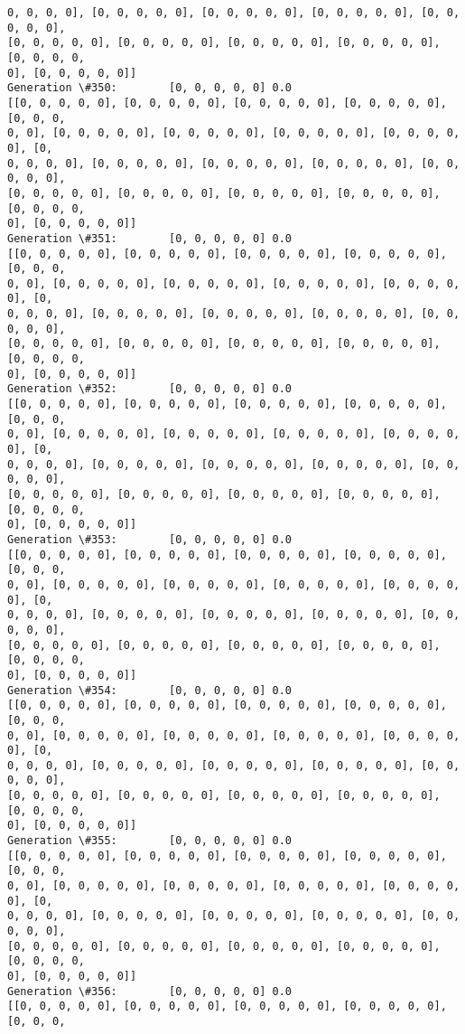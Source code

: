 \documentclass[11pt]{article}
\begin{document}
\begin{Verbatim}[commandchars=\\\{\}]
0, 0, 0, 0], [0, 0, 0, 0, 0], [0, 0, 0, 0, 0], [0, 0, 0, 0, 0], [0, 0, 0, 0, 0],
[0, 0, 0, 0, 0], [0, 0, 0, 0, 0], [0, 0, 0, 0, 0], [0, 0, 0, 0, 0], [0, 0, 0, 0,
0], [0, 0, 0, 0, 0]]
Generation \#350:        [0, 0, 0, 0, 0] 0.0
[[0, 0, 0, 0, 0], [0, 0, 0, 0, 0], [0, 0, 0, 0, 0], [0, 0, 0, 0, 0], [0, 0, 0,
0, 0], [0, 0, 0, 0, 0], [0, 0, 0, 0, 0], [0, 0, 0, 0, 0], [0, 0, 0, 0, 0], [0,
0, 0, 0, 0], [0, 0, 0, 0, 0], [0, 0, 0, 0, 0], [0, 0, 0, 0, 0], [0, 0, 0, 0, 0],
[0, 0, 0, 0, 0], [0, 0, 0, 0, 0], [0, 0, 0, 0, 0], [0, 0, 0, 0, 0], [0, 0, 0, 0,
0], [0, 0, 0, 0, 0]]
Generation \#351:        [0, 0, 0, 0, 0] 0.0
[[0, 0, 0, 0, 0], [0, 0, 0, 0, 0], [0, 0, 0, 0, 0], [0, 0, 0, 0, 0], [0, 0, 0,
0, 0], [0, 0, 0, 0, 0], [0, 0, 0, 0, 0], [0, 0, 0, 0, 0], [0, 0, 0, 0, 0], [0,
0, 0, 0, 0], [0, 0, 0, 0, 0], [0, 0, 0, 0, 0], [0, 0, 0, 0, 0], [0, 0, 0, 0, 0],
[0, 0, 0, 0, 0], [0, 0, 0, 0, 0], [0, 0, 0, 0, 0], [0, 0, 0, 0, 0], [0, 0, 0, 0,
0], [0, 0, 0, 0, 0]]
Generation \#352:        [0, 0, 0, 0, 0] 0.0
[[0, 0, 0, 0, 0], [0, 0, 0, 0, 0], [0, 0, 0, 0, 0], [0, 0, 0, 0, 0], [0, 0, 0,
0, 0], [0, 0, 0, 0, 0], [0, 0, 0, 0, 0], [0, 0, 0, 0, 0], [0, 0, 0, 0, 0], [0,
0, 0, 0, 0], [0, 0, 0, 0, 0], [0, 0, 0, 0, 0], [0, 0, 0, 0, 0], [0, 0, 0, 0, 0],
[0, 0, 0, 0, 0], [0, 0, 0, 0, 0], [0, 0, 0, 0, 0], [0, 0, 0, 0, 0], [0, 0, 0, 0,
0], [0, 0, 0, 0, 0]]
Generation \#353:        [0, 0, 0, 0, 0] 0.0
[[0, 0, 0, 0, 0], [0, 0, 0, 0, 0], [0, 0, 0, 0, 0], [0, 0, 0, 0, 0], [0, 0, 0,
0, 0], [0, 0, 0, 0, 0], [0, 0, 0, 0, 0], [0, 0, 0, 0, 0], [0, 0, 0, 0, 0], [0,
0, 0, 0, 0], [0, 0, 0, 0, 0], [0, 0, 0, 0, 0], [0, 0, 0, 0, 0], [0, 0, 0, 0, 0],
[0, 0, 0, 0, 0], [0, 0, 0, 0, 0], [0, 0, 0, 0, 0], [0, 0, 0, 0, 0], [0, 0, 0, 0,
0], [0, 0, 0, 0, 0]]
Generation \#354:        [0, 0, 0, 0, 0] 0.0
[[0, 0, 0, 0, 0], [0, 0, 0, 0, 0], [0, 0, 0, 0, 0], [0, 0, 0, 0, 0], [0, 0, 0,
0, 0], [0, 0, 0, 0, 0], [0, 0, 0, 0, 0], [0, 0, 0, 0, 0], [0, 0, 0, 0, 0], [0,
0, 0, 0, 0], [0, 0, 0, 0, 0], [0, 0, 0, 0, 0], [0, 0, 0, 0, 0], [0, 0, 0, 0, 0],
[0, 0, 0, 0, 0], [0, 0, 0, 0, 0], [0, 0, 0, 0, 0], [0, 0, 0, 0, 0], [0, 0, 0, 0,
0], [0, 0, 0, 0, 0]]
Generation \#355:        [0, 0, 0, 0, 0] 0.0
[[0, 0, 0, 0, 0], [0, 0, 0, 0, 0], [0, 0, 0, 0, 0], [0, 0, 0, 0, 0], [0, 0, 0,
0, 0], [0, 0, 0, 0, 0], [0, 0, 0, 0, 0], [0, 0, 0, 0, 0], [0, 0, 0, 0, 0], [0,
0, 0, 0, 0], [0, 0, 0, 0, 0], [0, 0, 0, 0, 0], [0, 0, 0, 0, 0], [0, 0, 0, 0, 0],
[0, 0, 0, 0, 0], [0, 0, 0, 0, 0], [0, 0, 0, 0, 0], [0, 0, 0, 0, 0], [0, 0, 0, 0,
0], [0, 0, 0, 0, 0]]
Generation \#356:        [0, 0, 0, 0, 0] 0.0
[[0, 0, 0, 0, 0], [0, 0, 0, 0, 0], [0, 0, 0, 0, 0], [0, 0, 0, 0, 0], [0, 0, 0,

\end{Verbatim}
\end{document}
